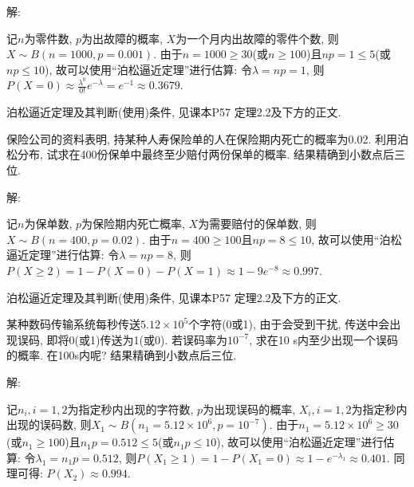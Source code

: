 \documentclass[standard]{ExBook}
\renewenvironment{shaded}{%
  \def\FrameCommand{\fboxsep=\FrameSep \colorbox{shadecolor}}%
  \MakeFramed{\advance\hsize-\width \FrameRestore}%
}{%
  \endMakeFramed
}
\begin{document}
\begin{qitems}
\vspace{\dimexpr2.5cm-5em\relax}

解: 

记$n$为零件数, $p$为出故障的概率, $X$为一个月内出故障的零件个数, 则$X\sim B(n=1000,p=0.001)$. 由于$n=1000\geq30$(或$n\geq100$)且$np=1 \leq 5$(或$np \leq 10$), 故可以使用``泊松逼近定理''进行估算: 令$\lambda=np=1$, 则$P(X=0)\approx\frac{\lambda^{0}}{0!}e^{-\lambda}=e^{-1}\approx0.3679$.

\textcolor{themeColor}{\selectfont {} 泊松逼近定理及其判断(使用)条件, 见课本P57 定理2.2及下方的正文.}

\vspace{2.5cm-5em}

    \begin{bbox}
    \begin{shaded}
        \qitem
保险公司的资料表明, 持某种人寿保险单的人在保险期内死亡的概率为0.02. 利用泊松分布, 试求在400份保单中最终至少赔付两份保单的概率. 结果精确到小数点后三位.
    \end{shaded}
    \end{bbox}

\vspace{\dimexpr2.5cm-5em\relax}

解: 

记$n$为保单数, $p$为保险期内死亡概率, $X$为需要赔付的保单数, 则$X\sim B(n=400,p=0.02)$. 由于$n=400\geq100$且$np=8 \leq 10$, 故可以使用``泊松逼近定理''进行估算: 令$\lambda=np=8$, 则$P(X \geq 2)=1-P(X=0)-P(X=1)\approx1-9e^{-8}\approx0.997$.

\textcolor{themeColor}{\selectfont {} 泊松逼近定理及其判断(使用)条件, 见课本P57 定理2.2及下方的正文.}

\vspace{2.5cm-5em}

    \begin{bbox}
    \begin{shaded}
        \qitem
某种数码传输系统每秒传送$5.12\times10^5$个字符(0或1), 由于会受到干扰, 传送中会出现误码, 即将0(或1)传送为1(或0). 若误码率为$10^{-7}$, 求在10 s内至少出现一个误码的概率. 在100s内呢? 结果精确到小数点后三位.
    \end{shaded}
    \end{bbox}

\vspace{\dimexpr2.5cm-5em\relax}

解: 

记$n_{i},i=1,2$为指定秒内出现的字符数, $p$为出现误码的概率, $X_{i},i=1,2$为指定秒内出现的误码数, 则$X_{1}\sim B(n_{1}=5.12\times10^{6},p=10^{-7})$. 由于$n_{1}=5.12\times10^{6}\geq30$(或$n_{1}\geq100$)且$n_{1}p=0.512 \leq 5$(或$n_{1}p \leq 10$), 故可以使用``泊松逼近定理''进行估算: 令$\lambda_{1}=n_{1}p=0.512$, 则$P(X_{1} \geq 1)=1-P(X_{1}=0)\approx1-e^{-\lambda_{1}}\approx0.401$. 同理可得: $P(X_{2})\approx0.994$.


\end{qitems}
\end{document}
